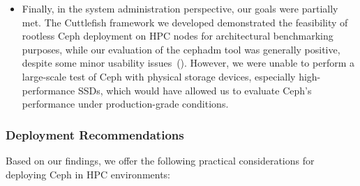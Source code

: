 \begin{itemize}
    \item Finally, in the system administration perspective, our goals were partially met. The Cuttlefish framework we developed demonstrated the feasibility of rootless Ceph deployment on \ac{HPC} nodes for architectural benchmarking purposes, while our evaluation of the cephadm tool was generally positive, despite some minor usability issues~(). However, we were unable to perform a large-scale test of Ceph with physical storage devices, especially high-performance \acp{SSD}, which would have allowed us to evaluate Ceph's performance under production-grade conditions.      
\end{itemize}

\subsubsection{Deployment Recommendations}
\label{sec:deployment-recommendations}

Based on our findings, we offer the following practical considerations for deploying Ceph in \ac{HPC} environments:

